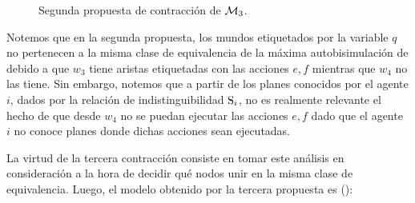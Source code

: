 \begin{figure}[h]
    \hspace{0.9cm}
    \vspace{0.4cm}
    \hspace{1.4cm}
    \caption{Segunda propuesta de contracción de $\modults_3$.}
    \label{fig:3rd-example-2nd-contraction}
\end{figure}

Notemos que en la segunda propuesta, los mundos etiquetados por la variable $q$ no pertenecen a la misma 
clase de equivalencia de la máxima autobisimulación de \bml debido a que $w_3$ tiene aristas 
etiquetadas con las acciones $e, f$ mientras que $w_4$ no las tiene. Sin embargo, notemos que a partir de los planes  
conocidos por el agente $i$, dados por la relación de indistinguibilidad $\S_i$, no es realmente relevante el hecho de que desde $w_4$ no 
se puedan ejecutar las acciones $e, f$ dado que el agente $i$ no conoce planes donde dichas acciones sean ejecutadas. 

La virtud de la tercera contracción consiste en tomar este análisis en consideración a la hora de decidir qué nodos unir en la misma 
clase de equivalencia. Luego, el modelo obtenido por la tercera propuesta es ():

